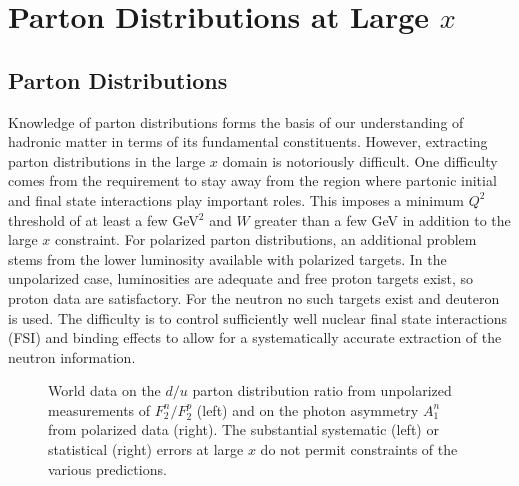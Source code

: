 \chapter{Parton Distributions at Large $x$}

\section{Parton Distributions} 
\label{F2A1}

Knowledge of parton distributions forms the basis of our understanding
of hadronic matter in terms of its fundamental constituents.  However, 
extracting parton distributions in the large $x$ domain is notoriously 
difficult.  One difficulty comes from the requirement to stay away from
the region where partonic initial and final state interactions play 
important roles.  This imposes a minimum $Q^2$ threshold of at least a few 
GeV$^2$ and $W$ greater than a few GeV in addition to the large $x$ constraint.
For polarized parton distributions, an additional problem stems from the lower 
luminosity available with polarized targets.  In the unpolarized case, 
luminosities are adequate and free proton targets exist, so proton data are 
satisfactory.  For the neutron no such targets exist and deuteron is used. 
The difficulty is to control sufficiently well nuclear final state 
interactions (FSI) and binding effects to allow for a systematically accurate 
extraction of the neutron information. 

\begin{figure}[htbp]
\vspace{6.5cm}
\caption{\small{World data on the $d/u$ parton distribution ratio from 
unpolarized measurements of $F_2^n/F_2^p$ (left) and on the photon asymmetry 
$A_1^n$ from polarized data (right).  The substantial systematic (left) or 
statistical (right) errors at large $x$ do not permit constraints of the 
various predictions.}}
\label{fig:largex} 
\end{figure}

